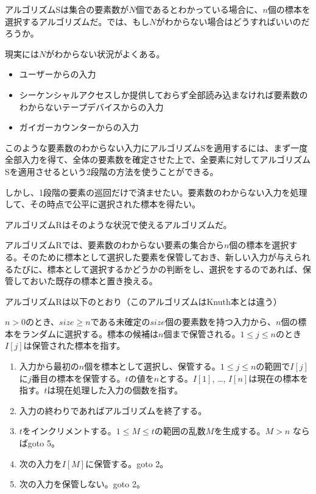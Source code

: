 %

アルゴリズムSは集合の要素数が\(N\)個であるとわかっている場合に、\(n\)個の標本を選択するアルゴリズムだ。では、もし\(N\)がわからない場合はどうすればいいのだろうか。

現実には\(N\)がわからない状況がよくある。

\begin{itemize}
\itemsep1pt\parskip0pt
\item
  ユーザーからの入力
\item
  シーケンシャルアクセスしか提供しておらず全部読み込まなければ要素数のわからないテープデバイスからの入力
\item
  ガイガーカウンターからの入力
\end{itemize}

このような要素数のわからない入力にアルゴリズムSを適用するには、まず一度全部入力を得て、全体の要素数を確定させた上で、全要素に対してアルゴリズムSを適用させるという2段階の方法を使うことができる。

しかし、1段階の要素の巡回だけで済ませたい。要素数のわからない入力を処理して、その時点で公平に選択された標本を得たい。

アルゴリズムRはそのような状況で使えるアルゴリズムだ。

アルゴリズムRでは、要素数のわからない要素の集合から\(n\)個の標本を選択する。そのために標本として選択した要素を保管しておき、新しい入力が与えられるたびに、標本として選択するかどうかの判断をし、選択をするのであれば、保管しておいた既存の標本と置き換える。

アルゴリズムRは以下のとおり（このアルゴリズムはKnuth本とは違う）

\(n > 0\)のとき、\(size \geq n\)である未確定の\(size\)個の要素数を持つ入力から、\(n\)個の標本をランダムに選択する。標本の候補は\(n\)個まで保管される。\(1 \leq j \leq n\)のとき\(I[j]\)は保管された標本を指す。

\begin{enumerate}
\def\labelenumi{\arabic{enumi}.}
\itemsep1pt\parskip0pt
\item
  入力から最初の\(n\)個を標本として選択し、保管する。\(1 \leq j \leq n\)の範囲で\(I[j]\)に\(j\)番目の標本を保管する。\(t\)の値を\(n\)とする。\(I[1]\),
  \ldots{},
  \(I[n]\)は現在の標本を指す。\(t\)は現在処理した入力の個数を指す。
\item
  入力の終わりであればアルゴリズムを終了する。
\item
  \(t\)をインクリメントする。\(1 \leq M \leq t\)の範囲の乱数\(M\)を生成する。\(M > n\)
  ならばgoto 5。
\item
  次の入力を\(I[M]\)に保管する。goto 2。
\item
  次の入力を保管しない。goto 2。
\end{enumerate}

